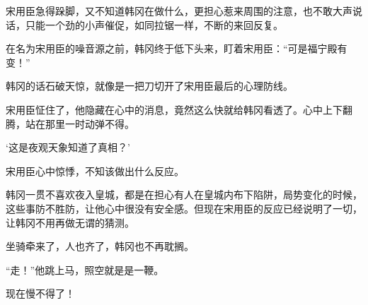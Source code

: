 宋用臣急得跺脚，又不知道韩冈在做什么，更担心惹来周围的注意，也不敢大声说话，只能一个劲的小声催促，如同拉锯一样，不断的来回反复。

在名为宋用臣的噪音源之前，韩冈终于低下头来，盯着宋用臣：“可是福宁殿有变！”

韩冈的话石破天惊，就像是一把刀切开了宋用臣最后的心理防线。

宋用臣怔住了，他隐藏在心中的消息，竟然这么快就给韩冈看透了。心中上下翻腾，站在那里一时动弹不得。

‘这是夜观天象知道了真相？’

宋用臣心中惊悸，不知该做出什么反应。

韩冈一贯不喜欢夜入皇城，都是在担心有人在皇城内布下陷阱，局势变化的时候，这些事防不胜防，让他心中很没有安全感。但现在宋用臣的反应已经说明了一切，让韩冈不用再做无谓的猜测。

坐骑牵来了，人也齐了，韩冈也不再耽搁。

“走！”他跳上马，照空就是是一鞭。

现在慢不得了！
